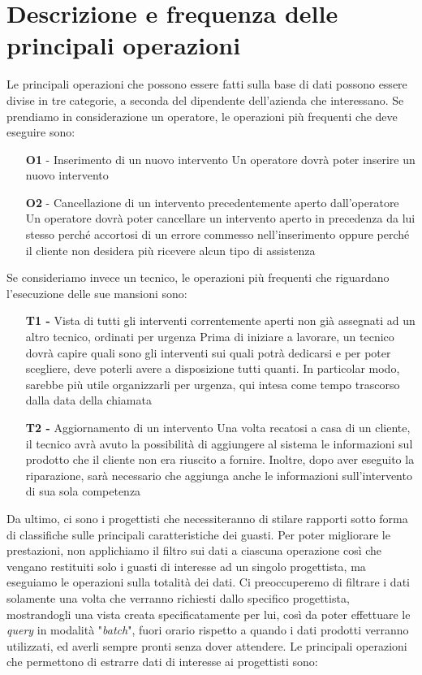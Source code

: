 \documentclass[a4paper, 12pt]{report}
\begin{document}
\section{Descrizione e frequenza delle principali operazioni}

Le principali operazioni che possono essere fatti sulla base di dati possono essere divise in tre categorie, a seconda del dipendente
dell'azienda che interessano. Se prendiamo in considerazione un operatore, le operazioni più frequenti che deve eseguire sono:

\begin{itemize}
	\item[\textbf{O1} -] Inserimento di un nuovo intervento
		\subitem Un operatore dovrà poter inserire un nuovo intervento 
	\item[\textbf{O2} -] Cancellazione di un intervento precedentemente aperto dall'operatore
		\subitem Un operatore dovrà poter cancellare un intervento aperto in precedenza da lui stesso perché accortosi di un errore commesso nell'inserimento
		oppure perché il cliente non desidera più ricevere alcun tipo di assistenza
\end{itemize}

Se consideriamo invece un tecnico, le operazioni più frequenti che riguardano l'esecuzione delle sue mansioni sono:

\begin{itemize}
	\item[\textbf{T1 -}] Vista di tutti gli interventi correntemente aperti non già assegnati ad un altro tecnico, ordinati per urgenza
		\subitem Prima di iniziare a lavorare, un tecnico dovrà capire quali sono gli interventi sui quali potrà dedicarsi e per poter scegliere, deve poterli avere a
		disposizione tutti quanti. In particolar modo, sarebbe più utile organizzarli per urgenza, qui intesa come tempo trascorso dalla data della chiamata
	\item[\textbf{T2 -}] Aggiornamento di un intervento
		\subitem Una volta recatosi a casa di un cliente, il tecnico avrà avuto la possibilità di aggiungere al sistema le informazioni sul prodotto che il cliente
		non era riuscito a fornire. Inoltre, dopo aver eseguito la riparazione, sarà necessario che aggiunga anche le informazioni sull'intervento di sua sola competenza
\end{itemize}

Da ultimo, ci sono i progettisti che necessiteranno di stilare rapporti sotto forma di classifiche sulle principali caratteristiche dei guasti. Per poter migliorare le prestazioni,
non applichiamo il filtro sui dati a ciascuna operazione così che vengano restituiti solo i guasti di interesse ad un singolo progettista, ma eseguiamo le operazioni sulla totalità
dei dati. Ci preoccuperemo di filtrare i dati solamente una volta che verranno richiesti dallo specifico progettista, mostrandogli una vista creata specificatamente per lui, così
da poter effettuare le \textit{query} in modalità "\textit{batch}", fuori orario rispetto a quando i dati prodotti verranno utilizzati, ed averli sempre pronti senza dover attendere.
Le principali operazioni che permettono di estrarre dati di interesse ai progettisti sono:
\end{document}
